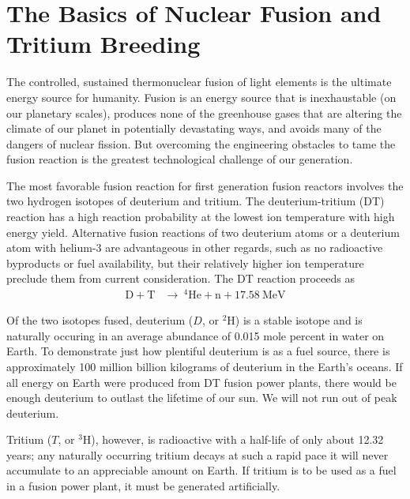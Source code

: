 \section{The Basics of Nuclear Fusion and Tritium Breeding}\label{sec:fusion-basics}
The controlled, sustained thermonuclear fusion of light elements is the ultimate energy source for humanity. Fusion is an energy source that is inexhaustable (on our planetary scales), produces none of the greenhouse gases that are altering the climate of our planet in potentially devastating ways, and avoids many of the dangers of nuclear fission. But overcoming the engineering obstacles to tame the fusion reaction is the greatest technological challenge of our generation.

The most favorable fusion reaction for first generation fusion reactors involves the two hydrogen isotopes of deuterium and tritium. The deuterium-tritium (DT) reaction has a high reaction probability at the lowest ion temperature with high energy yield. Alternative fusion reactions of two deuterium atoms or a deuterium atom with helium-3 are advantageous in other regards, such as no radioactive byproducts or fuel availability, but their relatively higher ion temperature preclude them from current consideration. The DT reaction proceeds as
\begin{align}
	\mathrm{D} + \mathrm{T}&\xrightarrow{}\ ^4\mathrm{He}+\mathrm{n}+17.58\ \text{MeV} \label{eq:dt-reaction}
\end{align}

Of the two isotopes fused, deuterium ($D$, or $^2$H) is a stable isotope and is naturally occuring in an average abundance of 0.015 mole percent in water on Earth. To demonstrate just how plentiful deuterium is as a fuel source, there is approximately 100 million billion kilograms of deuterium in the Earth's oceans. If all energy on Earth were produced from DT fusion power plants, there would be enough deuterium to outlast the lifetime of our sun. We will not run out of peak deuterium.  

Tritium ($T$, or $^3$H), however, is radioactive with a half-life of only about 12.32 years; any naturally occurring tritium decays at such a rapid pace it will never accumulate to an appreciable amount on Earth. If tritium is to be used as a fuel in a fusion power plant, it must be generated artificially. 

